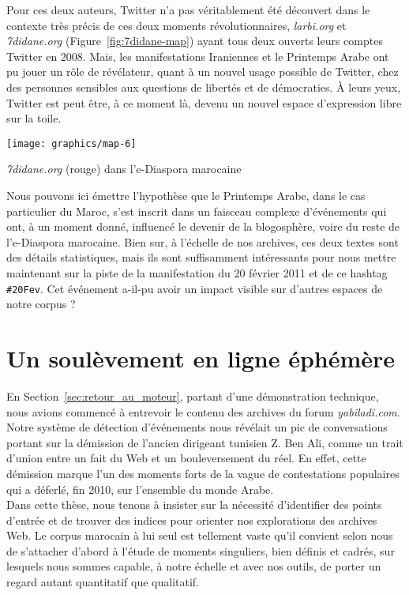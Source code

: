 \documentclass[symmetric,justified,marginals=raggedouter]{tufte-book}
\begin{document}
Pour ces deux auteurs, Twitter n'a pas véritablement été découvert dans le contexte très précis de ces deux moments révolutionnaires, \textit{larbi.org} et \textit{7didane.org} (Figure~\ref{fig:7didane-map}) ayant tous deux ouverts leurs comptes Twitter en 2008. Mais, les manifestations Iraniennes et le Printemps Arabe ont pu jouer un rôle de révélateur, quant à un nouvel usage possible de Twitter, chez des personnes sensibles aux questions de libertés et de démocraties. À leurs yeux, Twitter est peut être, à ce moment là, devenu un nouvel espace d'expression libre sur la toile. 

\begin{marginfigure}%
  \texttt{[image: graphics/map-6]}
  \vspace*{0.2cm}  
  \caption{\textit{7didane.org} (rouge) dans l'e-Diaspora marocaine}
  \label{fig:7didane-map}
\end{marginfigure} 

Nous pouvons ici émettre l'hypothèse que le Printemps Arabe, dans le cas particulier du Maroc, s'est inscrit dans un faisceau complexe d'événements qui ont, à un moment donné, influencé le devenir de la blogosphère, voire du reste de l'e-Diaspora marocaine. Bien sur, à l'échelle de nos archives, ces deux textes sont des détails statistiques, mais ils sont suffisamment intéressants pour nous mettre maintenant sur la piste de la manifestation du 20 février 2011 et de ce hashtag \texttt{\#20Fev}. Cet événement a-il-pu avoir un impact visible sur d'autres espaces de notre corpus ?

\section{Un soulèvement en ligne éphémère}
\label{sec:6_printemps}

\noindent En Section~\ref{sec:retour_au_moteur}, partant d'une démonstration technique, nous avions commencé à entrevoir le contenu des archives du forum \textit{yabiladi.com}. Notre système de détection d'événements nous révélait un pic de conversations portant sur la démission de l'ancien dirigeant tunisien Z. Ben Ali, comme un trait d'union entre un fait du Web et un bouleversement du réel. En effet, cette démission marque l'un des moments forts de la vague de contestations populaires qui a déferlé, fin 2010, sur l'ensemble du monde Arabe.\\

Dans cette thèse, nous tenons à insister sur la nécessité d'identifier des points d'entrée et de trouver des indices pour orienter nos explorations des archives Web. Le corpus marocain à lui seul est tellement vaste qu'il convient selon nous de s'attacher d'abord à l'étude de moments singuliers, bien définis et cadrés, sur lesquels nous sommes capable, à notre échelle et avec nos outils, de porter un regard autant quantitatif que qualitatif. 
\end{document}
